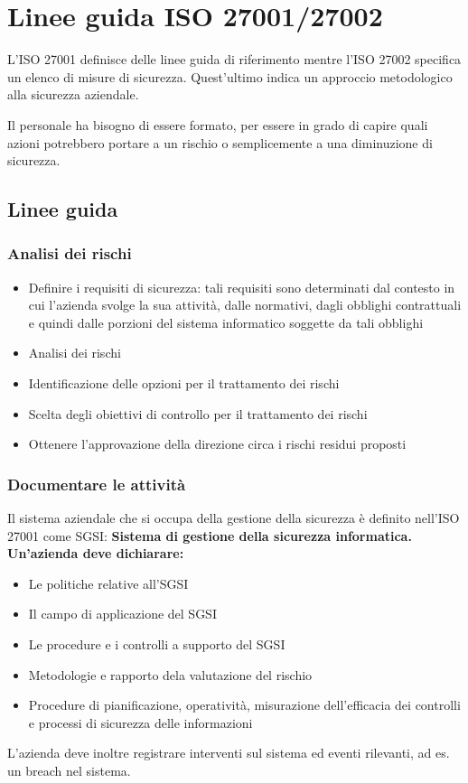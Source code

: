 \section{Linee guida ISO 27001/27002}

L'ISO 27001 definisce delle linee guida di riferimento mentre l'ISO 27002
specifica un elenco di misure di sicurezza. Quest'ultimo indica un approccio
metodologico alla sicurezza aziendale.

Il personale ha bisogno di essere formato, per essere in grado di capire quali
azioni potrebbero portare a un rischio o semplicemente a una diminuzione di
sicurezza.

\subsection{Linee guida}
\subsubsection{Analisi dei rischi}
\begin{itemize}
	\item Definire i requisiti di sicurezza: tali requisiti sono determinati dal contesto in cui l'azienda svolge la sua attivit\`a, dalle normativi, dagli obblighi contrattuali e quindi dalle porzioni del sistema informatico soggette da tali obblighi
	\item Analisi dei rischi
	\item Identificazione delle opzioni per il trattamento dei rischi
	\item Scelta degli obiettivi di controllo per il trattamento dei rischi
	\item Ottenere l’approvazione della direzione circa i rischi residui proposti
\end{itemize}
\subsubsection{Documentare le attivit\`a}
Il sistema aziendale che si occupa della gestione della sicurezza \`e definito nell'ISO 27001 come SGSI: \bf Sistema di gestione della sicurezza informatica\rm.
Un'azienda deve dichiarare:
\begin{itemize}
	\item Le politiche relative all'SGSI
	\item Il campo di applicazione del SGSI
	\item Le procedure e i controlli a supporto del SGSI
	\item Metodologie e rapporto dela valutazione del rischio
	\item Procedure di pianificazione, operativit\`a, misurazione dell'efficacia dei controlli e processi di sicurezza delle informazioni
\end{itemize}
L'azienda deve inoltre registrare interventi sul sistema ed eventi rilevanti, ad es. un breach nel sistema.
